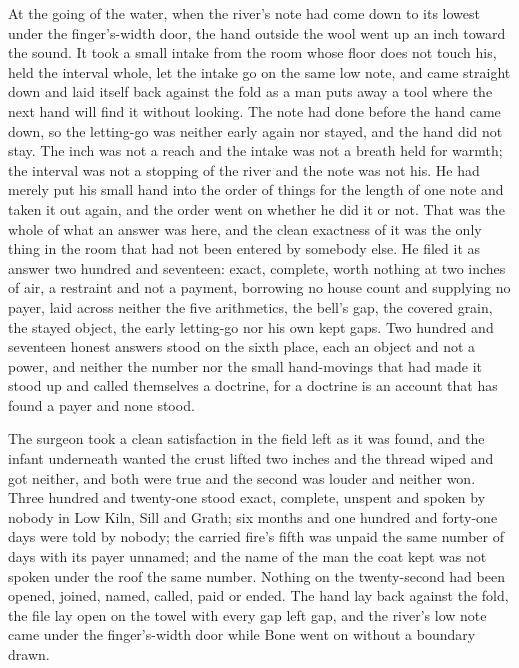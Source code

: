 At the going of the water, when the river's note had come down to its lowest under the finger's-width door, the hand outside the wool went up an inch toward the sound. It took a small intake from the room whose floor does not touch his, held the interval whole, let the intake go on the same low note, and came straight down and laid itself back against the fold as a man puts away a tool where the next hand will find it without looking. The note had done before the hand came down, so the letting-go was neither early again nor stayed, and the hand did not stay. The inch was not a reach and the intake was not a breath held for warmth; the interval was not a stopping of the river and the note was not his. He had merely put his small hand into the order of things for the length of one note and taken it out again, and the order went on whether he did it or not. That was the whole of what an answer was here, and the clean exactness of it was the only thing in the room that had not been entered by somebody else. He filed it as answer two hundred and seventeen: exact, complete, worth nothing at two inches of air, a restraint and not a payment, borrowing no house count and supplying no payer, laid across neither the five arithmetics, the bell's gap, the covered grain, the stayed object, the early letting-go nor his own kept gaps. Two hundred and seventeen honest answers stood on the sixth place, each an object and not a power, and neither the number nor the small hand-movings that had made it stood up and called themselves a doctrine, for a doctrine is an account that has found a payer and none stood.

The surgeon took a clean satisfaction in the field left as it was found, and the infant underneath wanted the crust lifted two inches and the thread wiped and got neither, and both were true and the second was louder and neither won. Three hundred and twenty-one stood exact, complete, unspent and spoken by nobody in Low Kiln, Sill and Grath; six months and one hundred and forty-one days were told by nobody; the carried fire's fifth was unpaid the same number of days with its payer unnamed; and the name of the man the coat kept was not spoken under the roof the same number. Nothing on the twenty-second had been opened, joined, named, called, paid or ended. The hand lay back against the fold, the file lay open on the towel with every gap left gap, and the river's low note came under the finger's-width door while Bone went on without a boundary drawn.
